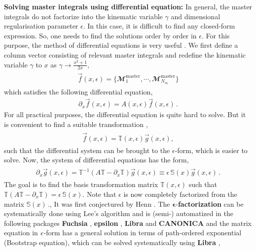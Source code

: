 \textbf{Solving master integrals using differential equation:} In general, the master integrals do not factorize into the kinematic variable $\gamma$ and dimensional regularisation parameter $\epsilon$. In this case, it is difficult to find any closed-form expression. So, one needs to find the solutions order by order in $\epsilon$. For this purpose, the method of differential equations is very useful \cite{Remiddi:1997ny,Kotikov:1991pm, Henn:2013pwa}. We first define a column vector consisting of relevant master integrals and redefine the kinematic variable $\gamma$ to $x$ as $\gamma\to \frac{x^2+1}{2x}$,
\begin{align}
    \begin{split}
        \vec f(x,\epsilon)=\{\mathbfcal{M}_1^{\textrm{master}},\cdots, \mathbfcal{M}_{N_m}^{\textrm{master}} \}
    \end{split}
\end{align}
which satisfies the following differential equation,
\begin{align}
      \partial_x \vec f(x,\epsilon)=A(x,\epsilon)
     \vec f(x,\epsilon)\,.\label{3.7}
\end{align}
For all practical purposes, the differential equation is quite hard to solve. But it is convenient to find a suitable transformation \cite{Henn:2014qga},
\begin{align}
    \begin{split}
        \vec f(x,\epsilon)=\mathbb{T}(x,\epsilon)\vec{g}(x,\epsilon),
    \end{split}
\end{align}
such that the differential system can be brought to the $\epsilon$-form, which is easier to solve. Now, the system of differential equations has the form,
\begin{align}
    \begin{split}
        \partial_x \vec g(x,\epsilon)=\mathbb{T}^{-1}(A \mathbb{T}-\partial_x \mathbb{T})\vec g(x,\epsilon)\equiv \epsilon\, \mathbb{S}(x) \vec g(x,\epsilon)\,.\label{2.14a}
    \end{split}
\end{align}
The goal is to find the basis transformation matrix $\mathbb{T}(x,\epsilon)$ such that $\mathbb{T}(A \mathbb{T}-\partial_x \mathbb{T})=\epsilon \,\mathbb{S}(x)$. Note that $\epsilon$ is now completely factorized from the matrix $\mathbb{S}(x)\,.$, It was first conjectured by Henn \cite{Henn:2013pwa}. The $\mathbf {\epsilon}$-\textbf{factorization} can be systematically done using Lee's algorithm \cite{Lee:2014ioa} and is (semi-) automatized in the following packages \textbf{Fuchsia} \cite{Gituliar:2017vzm}, \textbf{epsilon} \cite{Prausa:2017ltv}, \textbf{Libra} \cite{Lee:2020zfb} and \textbf{CANONICA} \cite{Meyer:2017joq} and the matrix equation in $\bf{\epsilon}$-form has a general solution in terms of path-ordered exponential (Bootstrap equation), which can be solved systematically using \textbf{Libra} \cite{Lee:2020zfb},
